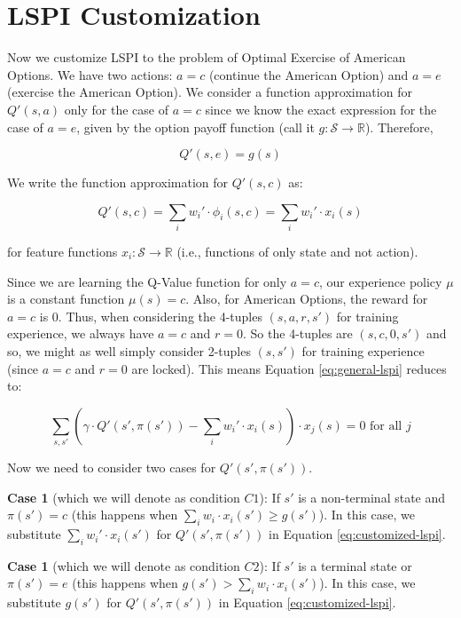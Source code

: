 \documentclass[12pt]{amsart}
\begin{document}
\section{LSPI Customization}

Now we customize LSPI to the problem of Optimal Exercise of American Options. We have two actions: $a=c$ (continue the American Option) and $a=e$ (exercise the American Option). We consider a function approximation for $Q'(s,a)$ only for the case of $a=c$ since we know the exact expression for the case of $a=e$, given by the option payoff function (call it $g: \mathcal{S} \rightarrow \mathbb{R}$). Therefore,

$$Q'(s,e) = g(s)$$

We write the function approximation for $Q'(s,c)$ as:

$$Q'(s,c) = \sum_i w_i' \cdot \phi_i(s, c) = \sum_i w_i' \cdot x_i(s)$$

for feature functions $x_i: \mathcal{S} \rightarrow \mathbb{R}$ (i.e., functions of only state and not action).

Since we are learning the Q-Value function for only $a=c$, our experience policy $\mu$ is a constant function $\mu(s) = c$. Also, for American Options, the reward for $a=c$ is 0. Thus, when considering the 4-tuples $(s,a,r,s')$ for training experience, we always have $a=c$ and $r=0$. So the 4-tuples are $(s,c,0,s')$ and so, we might as well simply consider 2-tuples $(s,s')$ for training experience (since $a=c$ and $r=0$ are locked). This means Equation \eqref{eq:general-lspi} reduces to:

\begin{equation}
\sum_{s,s'} (\gamma \cdot Q'(s',\pi(s')) - \sum_i w_i' \cdot x_i(s)) \cdot x_j(s) = 0 \text{ for all } j
\label{eq:customized-lspi}
\end{equation}

Now we need to consider two cases for $Q'(s',\pi(s'))$.

{\bf Case 1} (which we will denote as condition $C1$): If $s'$ is a non-terminal state and $\pi(s') = c$ (this happens when $\sum_i w_i \cdot x_i(s') \geq g(s')$). In this case, we substitute $\sum_i w_i' \cdot x_i(s')$ for $Q'(s',\pi(s'))$ in Equation \eqref{eq:customized-lspi}.

{\bf Case 1} (which we will denote as condition $C2$): If $s'$ is a terminal state or $\pi(s') = e$ (this happens when $g(s') > \sum_i w_i \cdot x_i(s')$). In this case, we substitute $g(s')$ for $Q'(s',\pi(s'))$ in Equation \eqref{eq:customized-lspi}.
\end{document}

